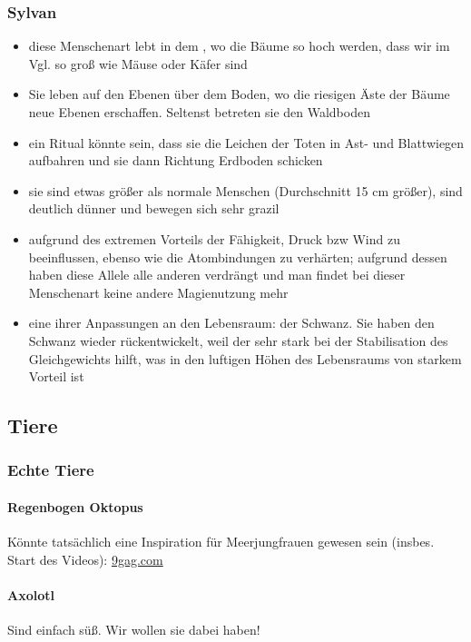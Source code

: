 \subsubsection{Sylvan} \label{rasse:sylvan}
\begin{itemize}
	\item diese Menschenart lebt in dem , wo die Bäume so hoch werden, dass wir im Vgl. so groß wie Mäuse oder Käfer sind
	\item Sie leben auf den Ebenen über dem Boden, wo die riesigen Äste der Bäume neue Ebenen erschaffen. Seltenst betreten sie den Waldboden
	\item ein Ritual könnte sein, dass sie die Leichen der Toten in Ast- und Blattwiegen aufbahren und sie dann  Richtung Erdboden schicken
	\item sie sind etwas größer als normale Menschen (Durchschnitt 15 cm größer), sind deutlich dünner und bewegen sich sehr grazil
	\item aufgrund des extremen Vorteils der Fähigkeit, Druck bzw Wind zu beeinflussen, ebenso wie die Atombindungen zu verhärten; aufgrund dessen haben diese Allele alle anderen verdrängt und man findet bei dieser Menschenart keine andere Magienutzung mehr
	\item eine ihrer Anpassungen an den Lebensraum: der Schwanz. Sie haben den Schwanz wieder rückentwickelt, weil der sehr stark bei der Stabilisation des Gleichgewichts hilft, was in den luftigen Höhen des Lebensraums von starkem Vorteil ist
\end{itemize}


\subsection{Tiere}
\subsubsection{Echte Tiere}
\paragraph{Regenbogen Oktopus} Könnte tatsächlich eine Inspiration für Meerjungfrauen gewesen sein (insbes. Start des Videos): \href{https://img-9gag-fun.9cache.com/photo/aVYpQVK\_460svvp9.webm}{9gag.com}
\paragraph{Axolotl} Sind einfach süß. Wir wollen sie dabei haben!

